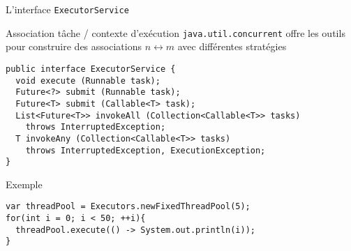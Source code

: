 
\begingroup

\begin{frame}[fragile]{L'interface \texttt{ExecutorService}}

\begin{block}{Association tâche / contexte d'exécution}
  \texttt{java.util.concurrent} offre les outils pour construire  des associations $n \leftrightarrow m$ avec différentes stratégies

  \begin{lstlisting}
public interface ExecutorService {
  void execute (Runnable task);
  Future<?> submit (Runnable task);
  Future<T> submit (Callable<T> task);
  List<Future<T>> invokeAll (Collection<Callable<T>> tasks)
    throws InterruptedException;
  T invokeAny (Collection<Callable<T>> tasks)
    throws InterruptedException, ExecutionException;
}
  \end{lstlisting}
\end{block}

  \begin{exampleblock}{Exemple}
  \begin{lstlisting}
var threadPool = Executors.newFixedThreadPool(5);
for(int i = 0; i < 50; ++i){
  threadPool.execute(() -> System.out.println(i));
}
  \end{lstlisting}
  \end{exampleblock}
  
\end{frame}

\endgroup
\endinput

